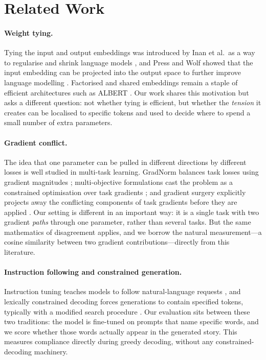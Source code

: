 \documentclass[conference]{IEEEtran}
\begin{document}
\section{Related Work}

\paragraph{Weight tying.}
Tying the input and output embeddings was introduced by Inan et al.\ as a way to
regularise and shrink language models \cite{inan}, and Press and Wolf showed that
the input embedding can be projected into the output space to further improve
language modelling \cite{press}. Factorised and shared embeddings remain a staple
of efficient architectures such as ALBERT \cite{albert}. Our work shares this
motivation but asks a different question: not whether tying is efficient, but
whether the \emph{tension} it creates can be localised to specific tokens and
used to decide where to spend a small number of extra parameters.

\paragraph{Gradient conflict.}
The idea that one parameter can be pulled in different directions by different
losses is well studied in multi-task learning. GradNorm balances task losses
using gradient magnitudes \cite{gradnorm}; multi-objective formulations cast the
problem as a constrained optimisation over task gradients \cite{sener}; and
gradient surgery explicitly projects away the conflicting components of task
gradients before they are applied \cite{pcgrad}. Our setting is different in an
important way: it is a single task with two gradient \emph{paths} through one
parameter, rather than several tasks. But the same mathematics of disagreement
applies, and we borrow the natural measurement---a cosine similarity between two
gradient contributions---directly from this literature.

\paragraph{Instruction following and constrained generation.}
Instruction tuning teaches models to follow natural-language requests
\cite{flan,instruct}, and lexically constrained decoding forces generations to
contain specified tokens, typically with a modified search procedure
\cite{constrained}. Our evaluation sits between these two traditions: the model
is fine-tuned on prompts that name specific words, and we score whether those
words actually appear in the generated story. This measures compliance directly
during greedy decoding, without any constrained-decoding machinery.
\end{document}
